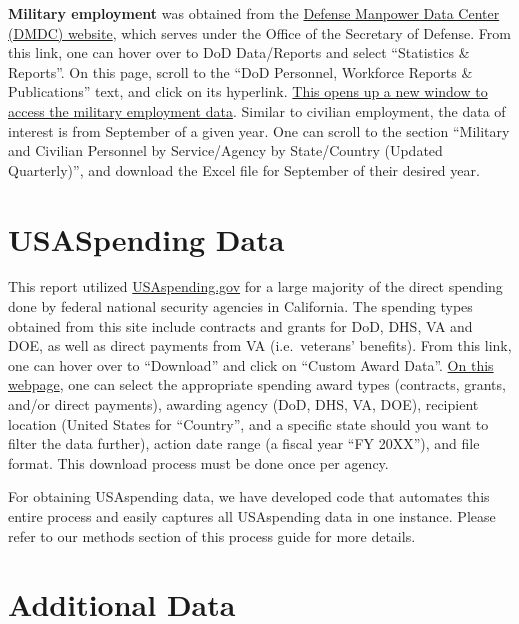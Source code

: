 \documentclass[
]{book}
\begin{document}
\textbf{Military employment} was obtained from the \href{https://dwp.dmdc.osd.mil/dwp/app/main}{Defense Manpower Data Center (DMDC) website}, which serves under the Office of the Secretary of Defense. From this link, one can hover over to DoD Data/Reports and select ``Statistics \& Reports''. On this page, scroll to the ``DoD Personnel, Workforce Reports \& Publications'' text, and click on its hyperlink. \href{https://dwp.dmdc.osd.mil/dwp/app/DoD-data-reports/workforce-reports}{This opens up a new window to access the military employment data}. Similar to civilian employment, the data of interest is from September of a given year. One can scroll to the section ``Military and Civilian Personnel by Service/Agency by State/Country (Updated Quarterly)'', and download the Excel file for September of their desired year.

\hypertarget{usaspending-data}{%
\section{USASpending Data}\label{usaspending-data}}

This report utilized \href{https://www.usaspending.gov/}{USAspending.gov} for a large majority of the direct spending done by federal national security agencies in California. The spending types obtained from this site include contracts and grants for DoD, DHS, VA and DOE, as well as direct payments from VA (i.e.~veterans' benefits). From this link, one can hover over to ``Download'' and click on ``Custom Award Data''. \href{https://www.usaspending.gov/download_center/custom_award_data}{On this webpage}, one can select the appropriate spending award types (contracts, grants, and/or direct payments), awarding agency (DoD, DHS, VA, DOE), recipient location (United States for ``Country'', and a specific state should you want to filter the data further), action date range (a fiscal year ``FY 20XX''), and file format. This download process must be done once per agency.

For obtaining USAspending data, we have developed code that automates this entire process and easily captures all USAspending data in one instance. Please refer to our methods section of this process guide for more details.

\hypertarget{additional-data}{%
\section{Additional Data}\label{additional-data}}
\end{document}
